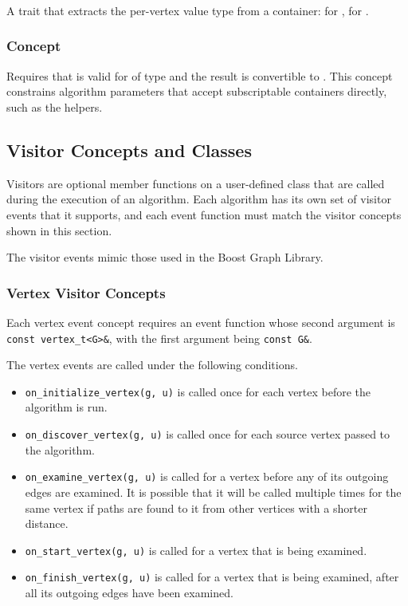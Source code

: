 \subsubsection{}
A trait that extracts the per-vertex value type from a  container:
 for ,  for .

\subsubsection{ Concept}
Requires that  is valid for  of type  and
the result is convertible to .
This concept constrains algorithm parameters that accept subscriptable containers directly,
such as the  helpers.

\subsection{Visitor Concepts and Classes}
Visitors are optional member functions on a user-defined class that are called during the execution of an algorithm. 
Each algorithm has its own set of visitor events that it supports, and each event function must match the visitor concepts 
shown in this section.

The visitor events mimic those used in the Boost Graph Library.

\subsubsection{Vertex Visitor Concepts}
{\small
      
}
Each vertex event concept requires an event function whose second argument is \lstinline{const vertex_t<G>&},
with the first argument being \lstinline{const G&}.

The vertex events are called under the following conditions.
\begin{itemize}
      \item \lstinline{on_initialize_vertex(g, u)}
            is called once for each vertex before the algorithm is run.
      \item \lstinline{on_discover_vertex(g, u)}
            is called once for each source vertex passed to the algorithm.
      \item \lstinline{on_examine_vertex(g, u)}
            is called for a vertex before any of its outgoing edges are examined.  It is possible
            that it will be called multiple times for the same vertex if paths are found to it
            from other vertices with a shorter distance.
      \item \lstinline{on_start_vertex(g, u)}
            is called for a vertex that is being examined.
      \item \lstinline{on_finish_vertex(g, u)}
            is called for a vertex that is being examined, after all its outgoing edges have been
            examined.
\end{itemize}


